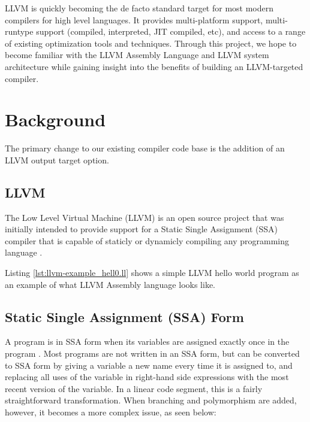 \documentclass[11pt]{article}
\begin{document}
LLVM is quickly becoming the de facto standard target for most modern
compilers for high level languages.  It provides multi-platform
support, multi-runtype support (compiled, interpreted, JIT compiled,
etc), and access to a range of existing optimization tools and
techniques. Through this project, we hope to become familiar with the
LLVM Assembly Language and LLVM system architecture while gaining
insight into the benefits of building an LLVM-targeted compiler.

\section{Background}

The primary change to our existing compiler code base is the addition
of an LLVM output target option.

\subsection{LLVM}

The Low Level Virtual Machine (LLVM) is an open source project that
was initially intended to provide support for a Static Single
Assignment (SSA) compiler that is capable of staticly or dynamicly
compiling any programming language \cite{llvm.org}.

Listing \ref{lst:llvm-example_hell0.ll} shows
a simple LLVM hello world program as an example of
what LLVM Assembly language looks like.



\subsection{Static Single Assignment (SSA) Form}

A program is in SSA form when its variables are assigned exactly once
in the program \cite{gcc-gnu.org}. Most programs are not written in an
SSA form, but can be converted to SSA form by giving a variable a new
name every time it is assigned to, and replacing all uses of the
variable in right-hand side expressions with the most recent version
of the variable. In a linear code segment, this is a fairly
straightforward transformation. When branching and polymorphism are
added, however, it becomes a more complex issue, as seen below:
\end{document}
